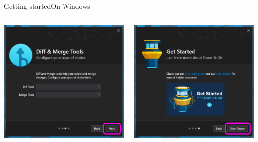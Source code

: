 \documentclass[aspectratio=169]{beamer}
\begin{document}
\begin{frame}{Getting started}{On Windows}
    \begin{columns}
        \begin{column}{0.5\textwidth}
            \centering
            \includegraphics[width=\linewidth]{diff_merge_tools.png}
        \end{column}
        \begin{column}{0.5\textwidth}
            \centering
            \includegraphics[width=\linewidth]{get_started.png}
        \end{column}
    \end{columns}
\end{frame}
\end{document}
